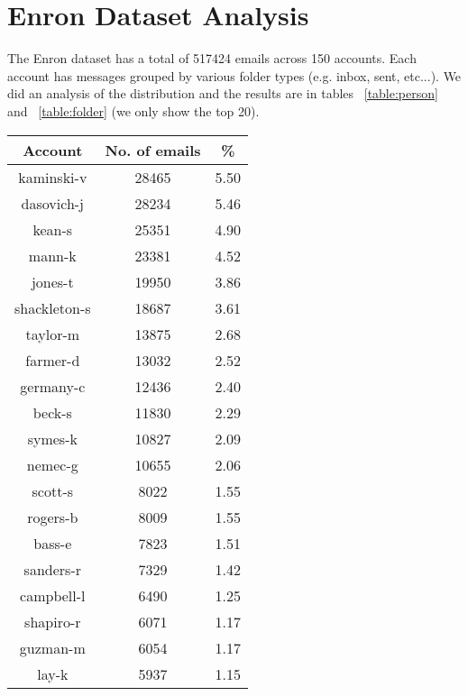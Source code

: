 \documentclass[senior,oneside]{UIUC}
\begin{document}
\section{Enron Dataset Analysis}

The Enron dataset has  a total of 517424 emails across 150 accounts. Each account has messages grouped by various folder types (e.g. inbox, sent, etc...). We did an analysis of the distribution and the results are in tables ~\ref{table:person} and ~\ref{table:folder} (we only show the top 20).

\begin{table}
\parbox{.45\linewidth}{
\begin{tabular}{c c c }
\hline \hline
Account & No. of emails & \% \\ [0.5ex]
\hline
kaminski-v & 28465 & 5.50 \\
dasovich-j & 28234 & 5.46 \\
kean-s & 25351 & 4.90 \\
mann-k & 23381 & 4.52 \\
jones-t & 19950 & 3.86 \\
shackleton-s & 18687 & 3.61 \\
taylor-m & 13875 & 2.68 \\
farmer-d & 13032 & 2.52 \\
germany-c & 12436 & 2.40 \\
beck-s & 11830 & 2.29 \\
symes-k & 10827 & 2.09 \\
nemec-g & 10655 & 2.06 \\
scott-s & 8022 & 1.55 \\
rogers-b & 8009 & 1.55 \\
bass-e & 7823 & 1.51 \\
sanders-r & 7329 & 1.42 \\
campbell-l & 6490 & 1.25 \\
shapiro-r & 6071 & 1.17 \\
guzman-m & 6054 & 1.17 \\
lay-k & 5937 & 1.15 


\end{tabular}}
\end{table}
\end{document}
